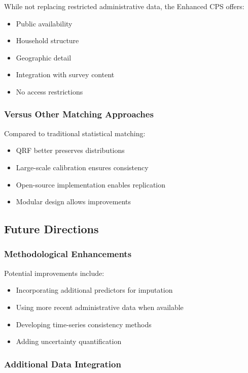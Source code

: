 While not replacing restricted administrative data, the Enhanced CPS offers:
\begin{itemize}
\item Public availability
\item Household structure
\item Geographic detail
\item Integration with survey content
\item No access restrictions
\end{itemize}

\subsubsection{Versus Other Matching Approaches}

Compared to traditional statistical matching:
\begin{itemize}
\item QRF better preserves distributions
\item Large-scale calibration ensures consistency
\item Open-source implementation enables replication
\item Modular design allows improvements
\end{itemize}

\subsection{Future Directions}

\subsubsection{Methodological Enhancements}

Potential improvements include:
\begin{itemize}
\item Incorporating additional predictors for imputation
\item Using more recent administrative data when available
\item Developing time-series consistency methods
\item Adding uncertainty quantification
\end{itemize}

\subsubsection{Additional Data Integration}

